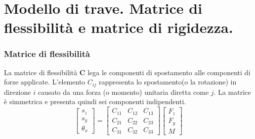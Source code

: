 \section{Modello di trave. Matrice di flessibilità e matrice di rigidezza.}

\subsubsection*{Matrice di flessibilità}

\begin{definizioneBox}
    La matrice di flessibilità $\boldsymbol{C}$ lega le componenti di spostamento alle componenti di forze applicate. L'elemento $C_{ij} $ rappresenta lo spostamento(o la rotazione) in direzione $i$ causato da una forza (o momento) unitaria diretta come $j$. La matrice è simmetrica e presenta quindi sei componenti  indipendenti.
    \begin{equation*}
    \begin{bmatrix}
s_z \\
s_y \\
\theta_x
\end{bmatrix}
=
\begin{bmatrix}
C_{11} & C_{12} & C_{13} \\
C_{21} & C_{22} & C_{23} \\
C_{31} & C_{32} & C_{33}
\end{bmatrix}
\begin{bmatrix}
F_z\\
F_y \\
M
\end{bmatrix}
\end{equation*}
\end{definizioneBox}

